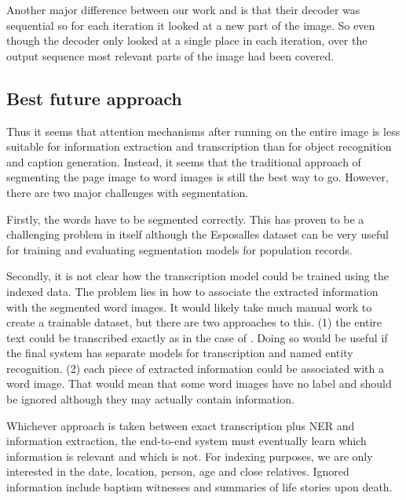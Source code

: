Another major difference between our work and \cite{AttendAndTell} is that their decoder was sequential so for each iteration it looked at a new part of the image. So even though the decoder only looked at a single place in each iteration, over the output sequence most relevant parts of the image had been covered.


\subsection{Best future approach}

Thus it seems that attention mechanisms after running on the entire image is less suitable for information extraction and transcription than for object recognition and caption generation. Instead, it seems that the traditional approach of segmenting the page image to word images is still the best way to go. However, there are two major challenges with segmentation.

Firstly, the words have to be segmented correctly. This has proven to be a challenging problem in itself although the Esposalles dataset \cite{esposalles} can be very useful for training and evaluating segmentation models for population records.

Secondly, it is not clear how the transcription model could be trained using the indexed data. The problem lies in how to associate the extracted information with the segmented word images. It would likely take much manual work to create a trainable dataset, but there are two approaches to this. (1) the entire text could be transcribed exactly as in the case of \cite{esposalles}. Doing so would be useful if the final system has separate models for transcription and named entity recognition.
(2) each piece of extracted information could be associated with a word image. That would mean that some word images have no label and should be ignored although they may actually contain information.

Whichever approach is taken between exact transcription plus NER and information extraction, the end-to-end system must eventually learn which information is relevant and which is not.
For indexing purposes, we are only interested in the date, location, person, age and close relatives. Ignored information include baptism witnesses and summaries of life stories upon death.

